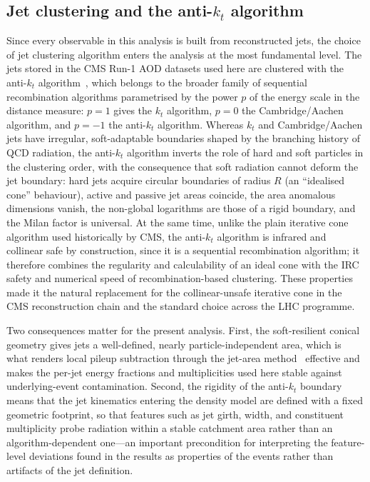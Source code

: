 \documentclass[11pt,a4paper,twocolumn]{article}
\begin{document}
\subsection{Jet clustering and the anti-$k_t$ algorithm}
\label{sec:lit-antikt}

Since every observable in this analysis is built from reconstructed jets, the choice of jet clustering algorithm enters the analysis at the most fundamental level. The jets stored in the CMS Run-1 AOD datasets used here are clustered with the anti-$k_t$ algorithm~\cite{Cacciari2008AntiKt}, which belongs to the broader family of sequential recombination algorithms parametrised by the power $p$ of the energy scale in the distance measure: $p=1$ gives the $k_t$ algorithm, $p=0$ the Cambridge/Aachen algorithm, and $p=-1$ the anti-$k_t$ algorithm. Whereas $k_t$ and Cambridge/Aachen jets have irregular, soft-adaptable boundaries shaped by the branching history of QCD radiation, the anti-$k_t$ algorithm inverts the role of hard and soft particles in the clustering order, with the consequence that soft radiation cannot deform the jet boundary: hard jets acquire circular boundaries of radius $R$ (an ``idealised cone'' behaviour), active and passive jet areas coincide, the area anomalous dimensions vanish, the non-global logarithms are those of a rigid boundary, and the Milan factor is universal. At the same time, unlike the plain iterative cone algorithm used historically by CMS, the anti-$k_t$ algorithm is infrared and collinear safe by construction, since it is a sequential recombination algorithm; it therefore combines the regularity and calculability of an ideal cone with the IRC safety and numerical speed of recombination-based clustering. These properties made it the natural replacement for the collinear-unsafe iterative cone in the CMS reconstruction chain and the standard choice across the LHC programme.

Two consequences matter for the present analysis. First, the soft-resilient conical geometry gives jets a well-defined, nearly particle-independent area, which is what renders local pileup subtraction through the jet-area method~\cite{Cacciari2008Pileup} effective and makes the per-jet energy fractions and multiplicities used here stable against underlying-event contamination. Second, the rigidity of the anti-$k_t$ boundary means that the jet kinematics entering the density model are defined with a fixed geometric footprint, so that features such as jet girth, width, and constituent multiplicity probe radiation within a stable catchment area rather than an algorithm-dependent one---an important precondition for interpreting the feature-level deviations found in the results as properties of the events rather than artifacts of the jet definition.
\end{document}

